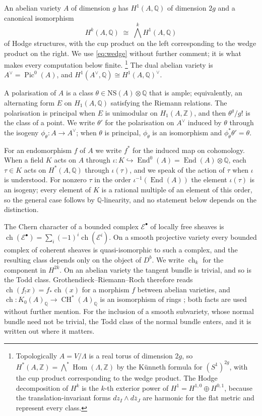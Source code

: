 \documentclass[11pt,reqno]{amsart}
\theoremstyle{plain}
\theoremstyle{definition}
\theoremstyle{remark}
\newcommand{\QQ}{\mathbb{Q}}
\newcommand{\ZZ}{\mathbb{Z}}
\newcommand{\Av}{A^{\vee}}
\newcommand{\cE}{\mathcal{E}}
\newcommand{\NS}{\mathrm{NS}}
\DeclareMathOperator{\CH}{CH}
\DeclareMathOperator{\ch}{ch}
\DeclareMathOperator{\End}{End}
\DeclareMathOperator{\Hom}{Hom}
\DeclareMathOperator{\Pic}{Pic}
\newcommand{\bbar}[1]{\overline{#1}}
\begin{document}
An abelian variety $A$ of dimension $g$ has $H^{1}(A,\QQ)$ of dimension $2g$
and a canonical isomorphism
\begin{equation}\label{eq:wedge}
  H^{k}(A,\QQ)\;\cong\;\textstyle\bigwedge^{k}H^{1}(A,\QQ)
\end{equation}
of Hodge structures, with the cup product on the left corresponding to the
wedge product on the right. We use \eqref{eq:wedge} without further comment;
it is what makes every computation below finite.%
\footnote{Topologically $A=V/\Lambda$ is a real torus of dimension $2g$, so
$H^{*}(A,\ZZ)=\bigwedge^{*}\Hom(\Lambda,\ZZ)$ by the K\"unneth formula for
$(S^{1})^{2g}$, with the cup product corresponding to the wedge product. The
Hodge decomposition of $H^{k}$ is the $k$-th exterior power of
$H^{1}=H^{1,0}\oplus H^{0,1}$, because the translation-invariant forms
$dz_{I}\wedge d\bbar z_{J}$ are harmonic for the flat metric and represent
every class.}
The dual abelian variety is $\Av=\Pic^{0}(A)$, and
$H^{1}(\Av,\QQ)\cong H^{1}(A,\QQ)^{\vee}$.

A polarisation of $A$ is a class $\theta\in\NS(A)\otimes\QQ$ that is ample;
equivalently, an alternating form $E$ on $H_{1}(A,\QQ)$ satisfying the Riemann
relations. The polarisation is principal when $E$ is unimodular on
$H_{1}(A,\ZZ)$, and then $\theta^{g}/g!$ is the class of a point. We write
$\theta'$ for the polarisation on $\Av$ induced by $\theta$ through the
isogeny $\phi_{\theta}\colon A\to\Av$; when $\theta$ is principal,
$\phi_{\theta}$ is an isomorphism and $\phi_{\theta}^{*}\theta'=\theta$.

For an endomorphism $f$ of $A$ we write $f^{*}$ for the induced map on
cohomology. When a field $K$ acts on $A$ through
$\iota\colon K\hookrightarrow\End^{0}(A)=\End(A)\otimes\QQ$, each $\tau\in K$
acts on $H^{*}(A,\QQ)$ through $\iota(\tau)$, and we speak of the action of
$\tau$ when $\iota$ is understood. For nonzero $\tau$ in the order
$\iota^{-1}(\End(A))$ the element $\iota(\tau)$ is an isogeny; every element
of $K$ is a rational multiple of an element of this order, so the general
case follows by $\QQ$-linearity, and no statement below depends on the
distinction.

The Chern character of a bounded complex $\cE^{\bullet}$ of locally free
sheaves is $\ch(\cE^{\bullet})=\sum_{i}(-1)^{i}\ch(\cE^{i})$. On a smooth
projective variety every bounded complex of coherent sheaves is
quasi-isomorphic to such a complex, and the resulting class depends only on
the object of $D^{b}$. We write $\ch_{k}$ for the component in $H^{2k}$.
On an abelian variety the tangent bundle is trivial, and so is the Todd
class. Grothendieck--Riemann--Roch therefore reads
$\ch(f_{!}x)=f_{*}\ch(x)$ for a morphism $f$ between abelian varieties, and
$\ch\colon K_{0}(A)_{\QQ}\to\CH^{*}(A)_{\QQ}$ is an isomorphism of rings
\cite[Chapter~15]{Ful98}; both facts are used without further mention. For
the inclusion of a smooth subvariety, whose normal bundle need not be
trivial, the Todd class of the normal bundle enters, and it is written out
where it matters.
\end{document}
